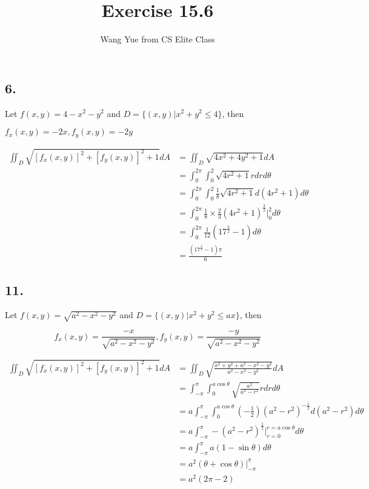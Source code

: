 \documentclass{article}
\begin{document}
  \title{Exercise 15.6}
  \author{Wang Yue from CS Elite Class}
  \maketitle

  \subsection*{6. }

  Let $f(x, y) = 4 - x^2 - y^2$ and $D = \{ (x, y) | x^2 + y^2 \leq 4\}$, then

  $f_x(x, y) = -2x, f_y(x, y) = -2y$

  $$\begin{aligned}
    \iint_D\sqrt{[f_x(x, y)]^2 + [f_y(x, y)]^2 + 1} dA &= \iint_D \sqrt{4x^2 + 4y^2 + 1} dA \\
    &= \int_0^{2\pi} \int_0^2 \sqrt{4r^2 + 1}r dr d\theta \\
    &= \int_0^{2\pi} \int_0^2 \frac 1 8 \sqrt{4r^2 + 1}d(4r^2 + 1) d\theta \\
    &= \int_0^{2\pi} \frac 1 8\times \frac 2 3 (4r^2 + 1)^{\frac 3 2}\biggl|_0^2 d\theta \\
    &= \int_0^{2\pi} \frac{1}{12} (17^{\frac 3 2} - 1) d\theta \\
    &= \frac{(17^{\frac 3 2} - 1)\pi}{6}
  \end{aligned}$$

  \subsection*{11. }

  Let $f(x, y) = \sqrt{a^2-x^2-y^2}$ and $D = \{ (x, y) | x^2 + y^2 \leq ax \}$, then

  $$f_x(x, y) = \frac{-x}{\sqrt{a^2-x^2-y^2}}, f_y(x, y) = \frac{-y}{\sqrt{a^2-x^2-y^2}}$$

  $$\begin{aligned}
    \iint_D \sqrt{[f_x(x, y)]^2 + [f_y(x, y)]^2 + 1} dA &= \iint_D \sqrt{\frac{x^2+y^2+a^2-x^2-y^2}{a^2-x^2-y^2}} dA \\
    &= \int_{-\pi}^{\pi} \int_0^{a\cos \theta} \sqrt{\frac{a^2}{a^2-r^2}} r dr d\theta \\
    &= a\int_{-\pi}^{\pi} \int_0^{a\cos \theta} (-\frac 1 2) (a^2-r^2)^{-\frac 1 2} d(a^2-r^2) d\theta \\
    &= a\int_{-\pi}^{\pi} - (a^2-r^2)^{\frac 1 2}\biggl|_{r=0}^{r=a\cos \theta} d\theta \\
    &= a\int_{-\pi}^{\pi} a(1 - \sin \theta) d\theta \\
    &= a^2(\theta + \cos \theta)\biggl|_{-\pi}^{\pi} \\
    &= a^2(2\pi - 2)
  \end{aligned}$$
\end{document}
